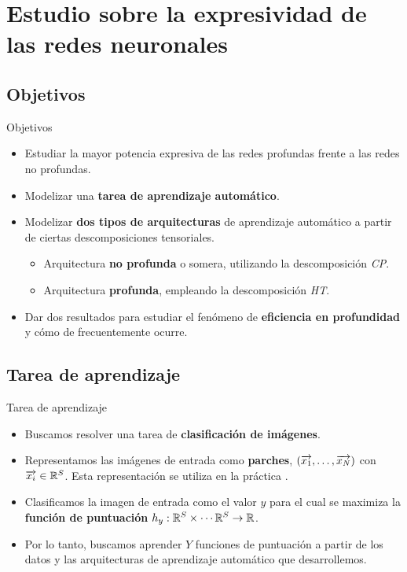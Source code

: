 \section{Estudio sobre la expresividad de las redes neuronales}

\subsection{Objetivos}
\begin{frame}{Objetivos}
	\begin{itemize}
		\item Estudiar la mayor potencia expresiva de las redes profundas frente a las redes no profundas.
		\item Modelizar una \textbf{tarea de aprendizaje automático}.
		\item Modelizar \textbf{dos tipos de arquitecturas} de aprendizaje automático a partir de ciertas descomposiciones tensoriales.
		      \begin{itemize}
			      \item Arquitectura \textbf{no profunda} o somera, utilizando la descomposición \textit{CP}.
			      \item Arquitectura \textbf{profunda}, empleando la descomposición \textit{HT}.
		      \end{itemize}
		\item Dar dos resultados para estudiar el fenómeno de \textbf{eficiencia en profundidad} y cómo de frecuentemente ocurre.
	\end{itemize}
\end{frame}

\subsection{Tarea de aprendizaje}
\begin{frame}{Tarea de aprendizaje}

	\begin{itemize}
		\item Buscamos resolver una tarea de \textbf{clasificación de imágenes}.
		\item Representamos las imágenes de entrada como \textbf{parches}, $(\overrightarrow{x_1}, \ldots, \overrightarrow{x_N})$ con $\overrightarrow{x_i} \in \mathbb{R}^S$. Esta representación se utiliza en la práctica \cite{matematicas:vit}.
		\item Clasificamos la imagen de entrada como el valor $y$ para el cual se maximiza la \textbf{función de puntuación} $h_y: \mathbb{R}^S \times \cdots \mathbb{R}^S \to \mathbb{R}$.
		\item Por lo tanto, buscamos aprender $Y$ funciones de puntuación a partir de los datos y las arquitecturas de aprendizaje automático que desarrollemos.
	\end{itemize}

\end{frame}

